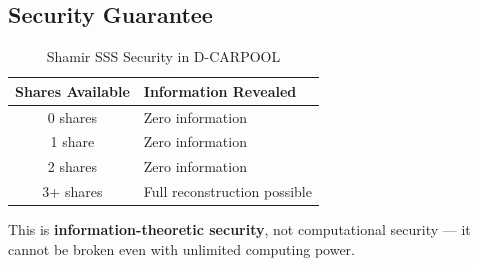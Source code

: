 \subsection{Security Guarantee}

\begin{table}[H]
\centering
\caption{Shamir SSS Security in D-CARPOOL}
\begin{tabular}{|c|p{8cm}|}
\hline
\textbf{Shares Available} & \textbf{Information Revealed} \\
\hline
0 shares & Zero information \\
1 share & Zero information \\
2 shares & Zero information \\
3+ shares & Full reconstruction possible \\
\hline
\end{tabular}
\end{table}

This is \textbf{information-theoretic security}, not computational security — it cannot be broken even with unlimited computing power.
